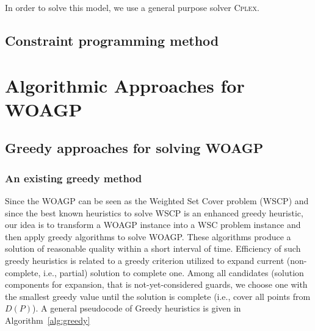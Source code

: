 \documentclass[runningheads,a4paper]{elsarticle}
\begin{document}
      In order to solve this model, we use a general purpose solver \textsc{Cplex}.
       \subsection{Constraint programming method}
       
     \section{Algorithmic Approaches for WOAGP}
     \subsection{Greedy approaches for solving WOAGP}
     \subsubsection{An existing greedy method}
          Since the WOAGP can be seen as the Weighted Set Cover problem (WSCP) and since the best known heuristics to solve WSCP is an enhanced greedy heuristic, our idea is to transform a WOAGP instance into a WSC problem instance and then
          apply greedy algorithms to solve WOAGP. These algorithms produce a solution of reasonable quality within a short interval of time. Efficiency of such greedy heuristics is related to a greedy criterion utilized to expand current (non-complete, i.e., partial) solution to complete one. Among all candidates (solution components for expansion, that is not-yet-considered guards, we choose one with the smallest greedy value until the solution is complete (i.e., cover all  points from $D(P)$).
          A general pseudocode of Greedy heuristics is given in Algorithm~\ref{alg:greedy}
\end{document}
